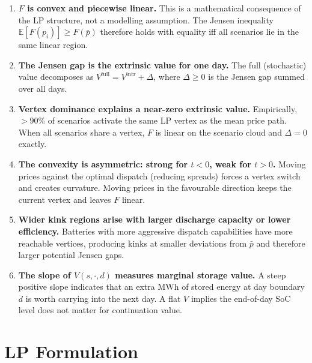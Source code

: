 \documentclass[11pt, a4paper]{article}
\theoremstyle{plain}
\theoremstyle{definition}
\newcommand{\E}{\mathbb{E}}
\newcommand{\pbar}{\bar{p}}
\begin{document}
\begin{enumerate}
  \item \textbf{$F$ is convex and piecewise linear.}
    This is a mathematical consequence of the LP structure, not a modelling
    assumption.  The Jensen inequality $\E[F(p_i)] \geq F(\pbar)$ therefore
    holds with equality iff all scenarios lie in the same linear region.

  \item \textbf{The Jensen gap is the extrinsic value for one day.}
    The full (stochastic) value decomposes as
    $V^{\mathrm{full}} = V^{\mathrm{intr}} + \Delta$,
    where $\Delta \geq 0$ is the Jensen gap summed over all days.

  \item \textbf{Vertex dominance explains a near-zero extrinsic value.}
    Empirically, $> 90\%$ of scenarios activate the same LP vertex as the
    mean price path.  When all scenarios share a vertex, $F$ is linear
    on the scenario cloud and $\Delta = 0$ exactly.

  \item \textbf{The convexity is asymmetric: strong for $t < 0$, weak for $t > 0$.}
    Moving prices against the optimal dispatch (reducing spreads) forces
    a vertex switch and creates curvature.  Moving prices in the favourable
    direction keeps the current vertex and leaves $F$ linear.

  \item \textbf{Wider kink regions arise with larger discharge capacity or lower efficiency.}
    Batteries with more aggressive dispatch capabilities have more reachable
    vertices, producing kinks at smaller deviations from $\pbar$ and
    therefore larger potential Jensen gaps.

  \item \textbf{The slope of $V(s, \cdot, d)$ measures marginal storage value.}
    A steep positive slope indicates that an extra MWh of stored energy
    at day boundary $d$ is worth carrying into the next day.
    A flat $V$ implies the end-of-day SoC level does not matter for
    continuation value.
\end{enumerate}

\appendix
\section{LP Formulation}
\label{app:lp}
\end{document}
